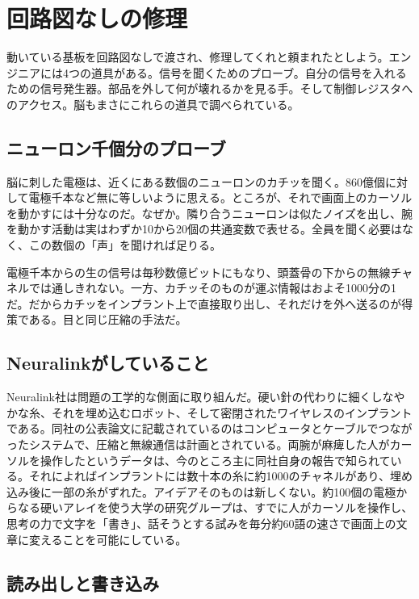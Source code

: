 \chapter{回路図なしの修理}


動いている基板を回路図なしで渡され、修理してくれと頼まれたとしよう。エンジニアには4つの道具がある。信号を聞くためのプローブ。自分の信号を入れるための信号発生器。部品を外して何が壊れるかを見る手。そして制御レジスタへのアクセス。脳もまさにこれらの道具で調べられている。

\section*{ニューロン千個分のプローブ}

脳に刺した電極は、近くにある数個のニューロンのカチッを聞く。860億個に対して電極千本など無に等しいように思える。ところが、それで画面上のカーソルを動かすには十分なのだ。なぜか。隣り合うニューロンは似たノイズを出し、腕を動かす活動は実はわずか10から20個の共通変数で表せる。全員を聞く必要はなく、この数個の「声」を聞ければ足りる。

電極千本からの生の信号は毎秒数億ビットにもなり、頭蓋骨の下からの無線チャネルでは通しきれない。一方、カチッそのものが運ぶ情報はおよそ1000分の1だ。だからカチッをインプラント上で直接取り出し、それだけを外へ送るのが得策である。目と同じ圧縮の手法だ。

\section*{Neuralinkがしていること}

Neuralink社は問題の工学的な側面に取り組んだ。硬い針の代わりに細くしなやかな糸、それを埋め込むロボット、そして密閉されたワイヤレスのインプラントである。同社の公表論文に記載されているのはコンピュータとケーブルでつながったシステムで、圧縮と無線通信は計画とされている。両腕が麻痺した人がカーソルを操作したというデータは、今のところ主に同社自身の報告で知られている。それによればインプラントには数十本の糸に約1000のチャネルがあり、埋め込み後に一部の糸がずれた。アイデアそのものは新しくない。約100個の電極からなる硬いアレイを使う大学の研究グループは、すでに人がカーソルを操作し、思考の力で文字を「書き」、話そうとする試みを毎分約60語の速さで画面上の文章に変えることを可能にしている。

\section*{読み出しと書き込み}

